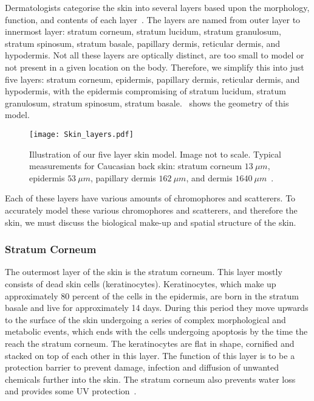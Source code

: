 Dermatologists categorise the skin into several layers based upon the morphology, function, and contents of each layer~\cite{freedberg1999fitzpatrick,zaidi2010dermatology}.
The layers are named from outer layer to innermost layer: stratum corneum, stratum lucidum, stratum granulosum, stratum spinosum, stratum basale, papillary dermis, reticular dermis, and hypodermis.
Not all these layers are optically distinct, are too small to model or not present in a given location on the body.
Therefore, we simplify this into just five layers: stratum corneum, epidermis, papillary dermis, reticular dermis, and hypodermis, with the epidermis compromising of stratum lucidum, stratum granulosum, stratum spinosum, stratum basale.~ shows the geometry of this model.

\begin{figure}[!htpb]
    \centering
    \texttt{[image: Skin\_layers.pdf]}
    \caption{Illustration of our five layer skin model. Image not to scale. Typical measurements for Caucasian back skin: stratum corneum $13~\mu m$, epidermis $53~\mu m$, papillary dermis $162~\mu m$, and dermis $1640~\mu m$~\cite{southwood1955thickness}.}
    \label{fig:skinexample}
\end{figure}

Each of these layers have various amounts of chromophores and scatterers.
To accurately model these various chromophores and scatterers, and therefore the skin, we must discuss the biological make-up and spatial structure of the skin.

\subsubsection*{Stratum Corneum} %
\label{sub:stratum}

The outermost layer of the skin is the stratum corneum.
This layer mostly consists of dead skin cells (keratinocytes).
Keratinocytes, which make up approximately 80 percent of the cells in the epidermis, are born in the stratum basale and live for approximately 14 days.
During this period they move upwards to the surface of the skin undergoing a series of complex morphological and metabolic events, which ends with the cells undergoing apoptosis by the time the reach the stratum corneum.
The keratinocytes are flat in shape, cornified and stacked on top of each other in this layer.
The function of this layer is to be a protection barrier to prevent damage, infection and diffusion of unwanted chemicals further into the skin.
The stratum corneum also prevents water loss and provides some UV protection~\cite{freedberg1999fitzpatrick,zaidi2010dermatology}.

